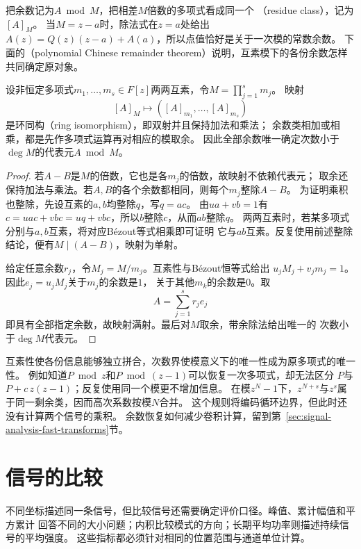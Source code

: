 把余数记为$A\bmod M$，把相差$M$倍数的多项式看成同一个
（residue class），记为$[A]_M$。
当$M=z-a$时，除法式在$z=a$处给出
$A(z)=Q(z)(z-a)+A(a)$，所以点值恰好是关于一次模的常数余数。
下面的（polynomial Chinese remainder theorem）说明，互素模下的各份余数怎样共同确定原对象。
\begin{theorem}[多项式中国剩余定理]
  \label{thm:signal-analysis-polynomial-crt}
  设非恒定多项式$m_1,\ldots,m_s\in F[z]$两两互素，令$M=\prod_{j=1}^s m_j$。
  映射
  \[
    [A]_M\longmapsto([A]_{m_1},\ldots,[A]_{m_s})
  \]
  是环同构（ring isomorphism），即双射并且保持加法和乘法；
  余数类相加或相乘，都是先作多项式运算再对相应的模取余。
  因此全部余数唯一确定次数小于$\deg M$的代表元$A\bmod M$。
\end{theorem}
\begin{proof}
  若$A-B$是$M$的倍数，它也是各$m_j$的倍数，故映射不依赖代表元；
  取余还保持加法与乘法。若$A,B$的各个余数都相同，则每个$m_j$整除$A-B$。
  为证明乘积也整除，先设互素的$a,b$均整除$q$，写$q=ac$。
  由$ua+vb=1$有$c=uac+vbc=uq+vbc$，所以$b$整除$c$，从而$ab$整除$q$。
  两两互素时，若某多项式分别与$a,b$互素，将对应Bézout等式相乘即可证明
  它与$ab$互素。反复使用前述整除结论，便有$M\mid(A-B)$，映射为单射。

  给定任意余数$r_j$，令$M_j=M/m_j$。互素性与Bézout恒等式给出
  $u_jM_j+v_jm_j=1$。因此$e_j=u_jM_j$关于$m_j$的余数是$1$，
  关于其他$m_k$的余数是$0$。取
  \[
    A=\sum_{j=1}^s r_je_j
  \]
  即具有全部指定余数，故映射满射。最后对$M$取余，带余除法给出唯一的
  次数小于$\deg M$代表元。
\end{proof}

互素性使各份信息能够独立拼合，次数界使模意义下的唯一性成为原多项式的唯一性。
例如知道$P\bmod z$和$P\bmod(z-1)$可以恢复一次多项式，却无法区分
$P$与$P+c\,z(z-1)$；反复使用同一个模更不增加信息。
在模$z^N-1$下，$z^{N+s}$与$z^s$属于同一剩余类，因而高次系数按模$N$合并。
这个规则将编码循环边界，但此时还没有计算两个信号的乘积。
余数恢复如何减少卷积计算，留到第~\ref{sec:signal-analysis-fast-transforms}节。

\section{信号的比较}
\label{sec:signal-comparison}

不同坐标描述同一条信号，但比较信号还需要确定评价口径。峰值、累计幅值和平方累计
回答不同的大小问题；内积比较模式的方向；长期平均功率则描述持续信号的平均强度。
这些指标都必须针对相同的位置范围与通道单位计算。

